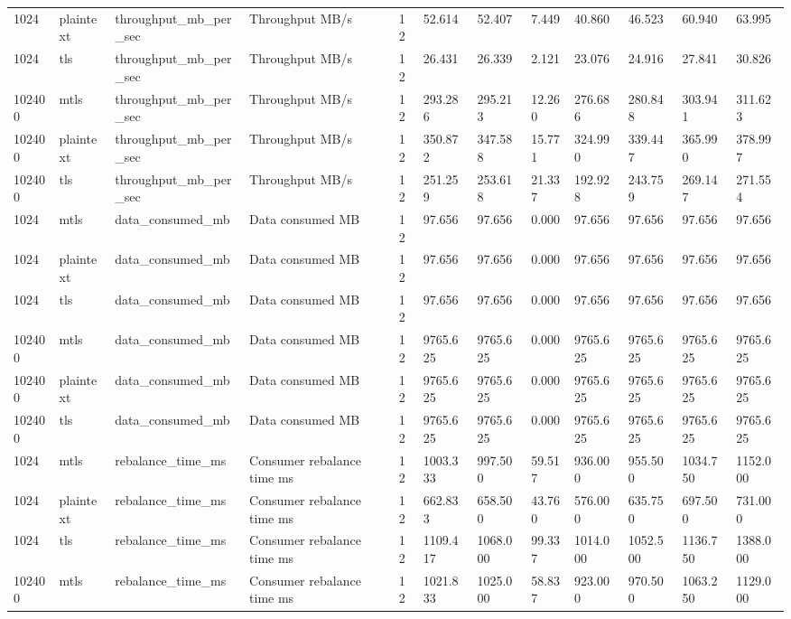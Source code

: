 \begin{longtable}{llllllllllll}
1024 & plaintext & throughput\_mb\_per\_sec & Throughput MB/s & 12 & 52.614 & 52.407 & 7.449 & 40.860 & 46.523 & 60.940 & 63.995 \\
1024 & tls & throughput\_mb\_per\_sec & Throughput MB/s & 12 & 26.431 & 26.339 & 2.121 & 23.076 & 24.916 & 27.841 & 30.826 \\
102400 & mtls & throughput\_mb\_per\_sec & Throughput MB/s & 12 & 293.286 & 295.213 & 12.260 & 276.686 & 280.848 & 303.941 & 311.623 \\
102400 & plaintext & throughput\_mb\_per\_sec & Throughput MB/s & 12 & 350.872 & 347.588 & 15.771 & 324.990 & 339.447 & 365.990 & 378.997 \\
102400 & tls & throughput\_mb\_per\_sec & Throughput MB/s & 12 & 251.259 & 253.618 & 21.337 & 192.928 & 243.759 & 269.147 & 271.554 \\
1024 & mtls & data\_consumed\_mb & Data consumed MB & 12 & 97.656 & 97.656 & 0.000 & 97.656 & 97.656 & 97.656 & 97.656 \\
1024 & plaintext & data\_consumed\_mb & Data consumed MB & 12 & 97.656 & 97.656 & 0.000 & 97.656 & 97.656 & 97.656 & 97.656 \\
1024 & tls & data\_consumed\_mb & Data consumed MB & 12 & 97.656 & 97.656 & 0.000 & 97.656 & 97.656 & 97.656 & 97.656 \\
102400 & mtls & data\_consumed\_mb & Data consumed MB & 12 & 9765.625 & 9765.625 & 0.000 & 9765.625 & 9765.625 & 9765.625 & 9765.625 \\
102400 & plaintext & data\_consumed\_mb & Data consumed MB & 12 & 9765.625 & 9765.625 & 0.000 & 9765.625 & 9765.625 & 9765.625 & 9765.625 \\
102400 & tls & data\_consumed\_mb & Data consumed MB & 12 & 9765.625 & 9765.625 & 0.000 & 9765.625 & 9765.625 & 9765.625 & 9765.625 \\
1024 & mtls & rebalance\_time\_ms & Consumer rebalance time ms & 12 & 1003.333 & 997.500 & 59.517 & 936.000 & 955.500 & 1034.750 & 1152.000 \\
1024 & plaintext & rebalance\_time\_ms & Consumer rebalance time ms & 12 & 662.833 & 658.500 & 43.760 & 576.000 & 635.750 & 697.500 & 731.000 \\
1024 & tls & rebalance\_time\_ms & Consumer rebalance time ms & 12 & 1109.417 & 1068.000 & 99.337 & 1014.000 & 1052.500 & 1136.750 & 1388.000 \\
102400 & mtls & rebalance\_time\_ms & Consumer rebalance time ms & 12 & 1021.833 & 1025.000 & 58.837 & 923.000 & 970.500 & 1063.250 & 1129.000 \\

\end{longtable}
